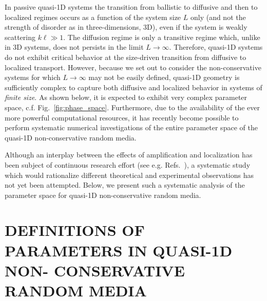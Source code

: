 In passive quasi-1D systems the transition from ballistic to diffusive and then to localized regimes occurs as a function of the system size $L$ only (and not the strength of disorder as in three-dimensions, 3D), even if the system is weakly scattering $k\ell\gg 1$. The diffusion regime is only a transitive regime which, unlike in 3D systems, does not persists in the limit $L\rightarrow\infty$. Therefore, quasi-1D systems 
\cite{1995_Kogan,1996_Paasschens_gain,1998_Brouwer,1998_Birman_waveguide,1998_Maret_PRL,1999_Muttalib,
2000_chabanov_nature,2002_Saenz_g,2005_Markos,2005_Genack_review,2006_Yamilov_conductance,2007_Botten_waveguide,
2007_Froufe-Perez_PRE,2007_deMatos_random_fiber_laser} do not exhibit critical behavior at the size-driven transition from diffusive to localized transport. However, because we set out to consider the non-conservative systems for which $L\rightarrow\infty$ may not be easily defined, quasi-1D geometry is sufficiently complex to capture both diffusive and localized behavior in systems of {\it finite size}. As shown below, it is expected to exhibit very complex parameter space, c.f. Fig.~\ref{fig:phase_space}. Furthermore, due to the availability of the ever more powerful computational resources, it has recently become possible to perform systematic numerical investigations of the entire parameter space of the quasi-1D non-conservative random media. 

Although an interplay between the effects of amplification and localization has been subject of continuous research effort (see e.g. Refs.~\cite{1994_Kumar,1995_Zhang,1995_zyuzin_fluctuations,1996_Paasschens_gain,1997_Freilikher_gain,1997_Wiersma_cbs,
2000_Cao_localization,2001_Soukoulis_modeDist,2001_Sebbah_FDTD,2004_Yamilov_intensity,2005_Genack_Milner,
2005_Apalkov_corr,2005_Yamilov_correlations,2006_Heinrichs,2006_Yamilov_conductance,2008_Stone,2008_Conti_opals,
2009_Frank,2010_Payne_PRL}), a systematic study which would rationalize different theoretical and experimental observations has not yet been attempted. Below, we present such a systematic analysis of the parameter space for quasi-1D non-conservative random media.

\section{DEFINITIONS OF PARAMETERS IN QUASI-1D NON- CONSERVATIVE RANDOM MEDIA}
\label{sec:parameters}


